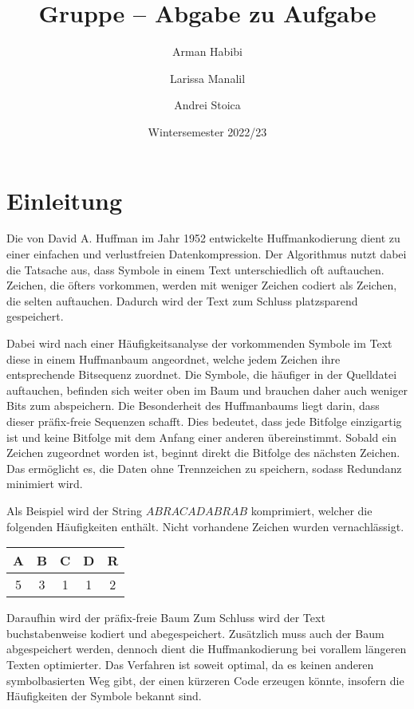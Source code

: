 \documentclass[course=erap]{aspdoc}
\author{Arman Habibi \and Larissa Manalil \and Andrei Stoica}
\date{Wintersemester 2022/23} %
\title{Gruppe \theGroup{} -- Abgabe zu Aufgabe \theNumber}
\begin{document}
\maketitle

\section{Einleitung}

Die von David A. Huffman im Jahr 1952 entwickelte Huffmankodierung dient zu einer einfachen und verlustfreien Datenkompression.
Der Algorithmus nutzt dabei die Tatsache aus, dass Symbole in einem Text unterschiedlich oft auftauchen. Zeichen, die öfters vorkommen, werden mit weniger Zeichen codiert als Zeichen, die selten auftauchen. Dadurch wird der Text zum Schluss platzsparend gespeichert.

Dabei wird nach einer Häufigkeitsanalyse der vorkommenden Symbole im Text diese in einem Huffmanbaum angeordnet, welche jedem Zeichen ihre entsprechende Bitsequenz zuordnet. Die Symbole, die häufiger in der Quelldatei auftauchen, befinden sich weiter oben im Baum und brauchen daher auch weniger Bits zum abspeichern. Die Besonderheit des Huffmanbaums liegt darin, dass dieser präfix-freie Sequenzen schafft.
Dies bedeutet, dass jede Bitfolge einzigartig ist und keine Bitfolge mit dem Anfang einer anderen übereinstimmt. Sobald ein Zeichen zugeordnet worden ist, beginnt direkt die Bitfolge des nächsten Zeichen. Das ermöglicht es, die Daten ohne Trennzeichen zu speichern, sodass Redundanz minimiert wird.

Als Beispiel wird der String $ABRACADABRAB$ komprimiert, welcher die folgenden Häufigkeiten enthält. Nicht vorhandene Zeichen wurden vernachlässigt.

\begin{center}
    \begin{tabular}{ |c|c|c|c|c| }
     \hline
     A & B & C & D & R \\
     \hline
     5 & 3 & 1 & 1 & 2 \\
     \hline
    \end{tabular}
\end{center}

Daraufhin wird der präfix-freie Baum
Zum Schluss wird der Text buchstabenweise kodiert und abegespeichert. Zusätzlich muss auch der Baum abgespeichert werden, dennoch dient die Huffmankodierung bei vorallem längeren Texten optimierter.
Das Verfahren ist soweit optimal, da es keinen anderen symbolbasierten Weg gibt, der einen kürzeren Code erzeugen könnte, insofern die Häufigkeiten der Symbole bekannt sind. \cite{4051119}
\end{document}
